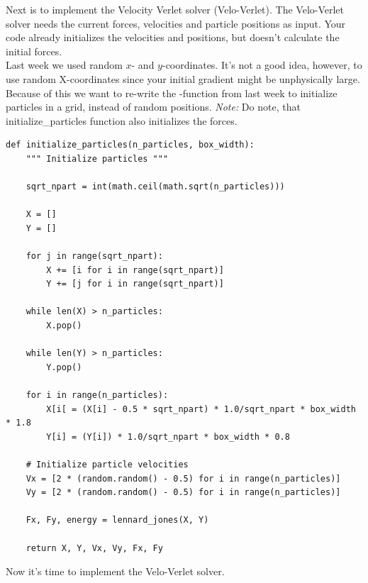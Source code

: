 \documentclass{article}
\begin{document}
\newpage

Next is to implement the Velocity Verlet solver (Velo-Verlet).
The Velo-Verlet solver needs the current forces, velocities and
particle positions as input. Your code already initializes the
velocities and positions, but doesn't calculate the initial forces. \\

Last week we used random $x$- and $y$-coordinates.
It's not a good idea, however, to use random X-coordinates since your initial
gradient might be unphysically large. \\

Because of this we want to re-write the -function
from last week to initialize particles in a grid, instead of random positions.
\textit{Note:} Do note, that initialize\_particles function also initializes
the forces.

\begin{lstlisting}
def initialize_particles(n_particles, box_width):
    """ Initialize particles """

    sqrt_npart = int(math.ceil(math.sqrt(n_particles)))

    X = []
    Y = []

    for j in range(sqrt_npart):
        X += [i for i in range(sqrt_npart)]
        Y += [j for i in range(sqrt_npart)]

    while len(X) > n_particles:
        X.pop()

    while len(Y) > n_particles:
        Y.pop()

    for i in range(n_particles):
        X[i[ = (X[i] - 0.5 * sqrt_npart) * 1.0/sqrt_npart * box_width * 1.8
        Y[i] = (Y[i]) * 1.0/sqrt_npart * box_width * 0.8

    # Initialize particle velocities
    Vx = [2 * (random.random() - 0.5) for i in range(n_particles)]
    Vy = [2 * (random.random() - 0.5) for i in range(n_particles)]

    Fx, Fy, energy = lennard_jones(X, Y)

    return X, Y, Vx, Vy, Fx, Fy

\end{lstlisting}


Now it's time to implement the Velo-Verlet solver.
\end{document}
